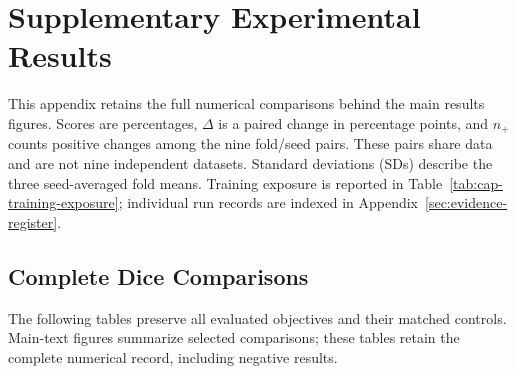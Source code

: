 \documentclass[12pt,a4paper]{article}
\begin{document}
\clearpage
\section{Supplementary Experimental Results}
\label{sec:extended-results}

This appendix retains the full numerical comparisons behind the main
results figures. Scores are percentages, $\Delta$ is a paired change in
percentage points, and $n_+$ counts positive changes among the nine
fold/seed pairs. These pairs share data and are not nine independent
datasets. Standard deviations (SDs) describe the three seed-averaged fold
means. Training exposure is reported in
Table~\ref{tab:cap-training-exposure}; individual run records are indexed
in Appendix~\ref{sec:evidence-register}.

\subsection{Complete Dice Comparisons}\label{sec:complete-result-tables}
The following tables preserve all evaluated objectives and their matched
controls. Main-text figures summarize selected comparisons; these tables
retain the complete numerical record, including negative results.
\end{document}
